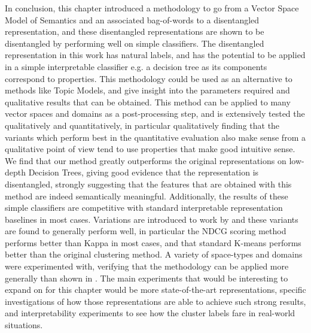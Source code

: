 In conclusion, this chapter introduced a methodology to go from a Vector Space Model of Semantics and an associated bag-of-words to a disentangled representation, and these disentangled representations are shown to be disentangled by performing well on simple classifiers. The disentangled representation in this work has natural labels, and has the potential to be applied in a simple interpretable classifier e.g. a decision tree as its components correspond to  properties. This methodology could be used as an alternative to methods like Topic Models, and give insight into the parameters required and qualitative results that can be obtained. This method can be applied to many vector spaces and domains as a post-processing step, and is extensively tested the qualitatively and quantitatively, in particular qualitatively finding that the variants which perform best in the quantitative evaluation also make sense from a qualitative point of view tend to use properties that make good intuitive sense. We find that our method greatly outperforms the original representations on low-depth Decision Trees, giving good evidence that  the representation is disentangled,  strongly suggesting that the features that are obtained with this method are indeed semantically meaningful. Additionally, the results of these simple classifiers are competitive with standard interpretable representation baselines in most cases. Variations are introduced to  work  by \cite{Derrac2015} and these variants are found to generally perform well, in particular the NDCG scoring method performs better than Kappa in most cases, and that standard K-means performs better than the original clustering method. A variety of space-types and domains were experimented with, verifying that the methodology can be applied more generally than shown in \cite{Derrac2015}. The main experiments that would be interesting to expand on for this chapter would be more state-of-the-art representations, specific investigations of how those representations are able to achieve such strong results, and interpretability experiments to see how the cluster labels fare in real-world situations.
